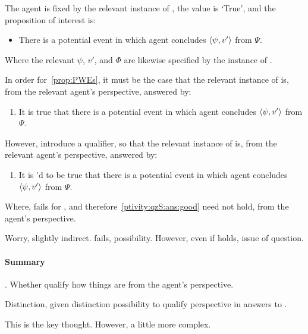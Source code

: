 \begin{note}[\ptivity{} \& \qzS{}]
  The agent is fixed by the relevant instance of \qzS{}, the value is `True', and the proposition of interest is:

  \begin{itemize}
  \item[]
    There is a potential event in which agent concludes \(\langle \psi, v' \rangle\) from \(\Psi\).
  \end{itemize}

  Where the relevant \(\psi\), \(v'\), and \(\Phi\) are likewise specified by the instance of \qzS{}.

  In order for~\autoref{prop:PWEs}, it must be the case that the relevant instance of \qzS{} is, from the relevant agent's perspective, answered by:

  \begin{enumerate}[label=A., ref=A]
  \item
    \label{ptivity:qzS:ans:good}
    It is true that there is a potential event in which agent concludes \(\langle \psi, v' \rangle\) from \(\Psi\).
  \end{enumerate}

  However, introduce a qualifier, so that the relevant instance of \qzS{} is, from the relevant agent's perspective, answered by:

  \begin{enumerate}[label=A\('\)., ref=A\('\)]
  \item
    \label{ptivity:qzS:ans:bad}
    It is \ptivityQV{}'d to be true that there is a potential event in which agent concludes \(\langle \psi, v' \rangle\) from \(\Psi\).
  \end{enumerate}

  Where, \ptivity{} fails for \ptivityQV{}, and therefore~\ref{ptivity:qzS:ans:good} need not hold, from the agent's perspective.

  Worry, slightly indirect.
  \ptivity{} fails, possibility.
  However, even if \ptivity{} holds, issue of question.
\end{note}

\paragraph{Summary}

\begin{note}
  \ptivity{}.
  Whether qualify how things are from the agent's perspective.

  Distinction, given distinction possibility to qualify perspective in answers to \qzS{}.

  This is the key thought.
  However, a little more complex.
\end{note}


